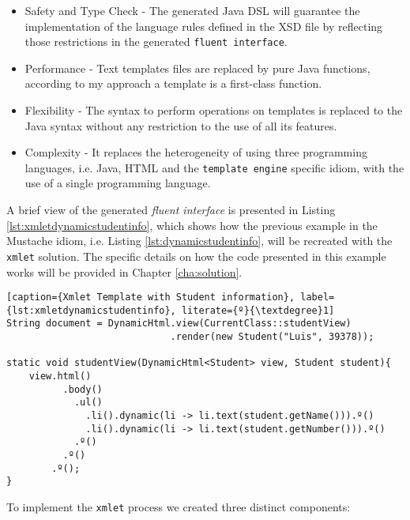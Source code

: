 \begin{itemize}
	\item Safety and Type Check - The generated Java \ac{DSL} will guarantee the implementation of the language rules defined in the \ac{XSD} file by reflecting those restrictions in the generated \texttt{fluent interface}.
	\item Performance - Text templates files are replaced by pure Java functions, according to my approach a template is a first-class function.
	\item Flexibility - The syntax to perform operations on templates is replaced to the Java syntax without any restriction to the use of all its features.
	\item Complexity - It replaces the heterogeneity of using three programming languages, i.e. Java, \ac{HTML} and the \texttt{template engine} specific idiom, with the use of a single programming language.
\end{itemize}

\noindent
A brief view of the generated \textit{fluent interface} is presented in Listing \ref{lst:xmletdynamicstudentinfo}, which shows how the previous example in the Mustache idiom, i.e. Listing \ref{lst:dynamicstudentinfo}, will be recreated with the \texttt{xmlet} solution. The specific details on how the code presented in this example works will be provided in Chapter \ref{cha:solution}.

\bigskip


\begin{minipage}{\linewidth}
\begin{lstlisting}[caption={Xmlet Template with Student information}, label={lst:xmletdynamicstudentinfo}, literate={º}{\textdegree}1]
String document = DynamicHtml.view(CurrentClass::studentView)
                             .render(new Student("Luis", 39378));

static void studentView(DynamicHtml<Student> view, Student student){
    view.html()
          .body()
            .ul()
              .li().dynamic(li -> li.text(student.getName())).º()
              .li().dynamic(li -> li.text(student.getNumber())).º()
            .º()
          .º()
        .º();   
}
\end{lstlisting}
\end{minipage} 

\noindent
To implement the \texttt{xmlet} process we created three distinct components:

